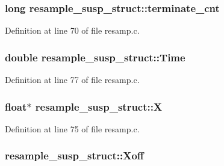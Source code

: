\subsubsection[{\texorpdfstring{terminate\+\_\+cnt}{terminate_cnt}}]{\setlength{\rightskip}{0pt plus 5cm}long resample\+\_\+susp\+\_\+struct\+::terminate\+\_\+cnt}\hypertarget{structresample__susp__struct_a2b492b96f18aa250e3dcd38f0ed374ac}{}\label{structresample__susp__struct_a2b492b96f18aa250e3dcd38f0ed374ac}


Definition at line 70 of file resamp.\+c.

\subsubsection[{\texorpdfstring{Time}{Time}}]{\setlength{\rightskip}{0pt plus 5cm}double resample\+\_\+susp\+\_\+struct\+::\+Time}\hypertarget{structresample__susp__struct_a0d18bcc4f4fa6c528de65a4a0dceaa4f}{}\label{structresample__susp__struct_a0d18bcc4f4fa6c528de65a4a0dceaa4f}


Definition at line 77 of file resamp.\+c.

\subsubsection[{\texorpdfstring{X}{X}}]{\setlength{\rightskip}{0pt plus 5cm}float$\ast$ resample\+\_\+susp\+\_\+struct\+::X}\hypertarget{structresample__susp__struct_a4330450bbb9aadd67d9504d26f7f4ed4}{}\label{structresample__susp__struct_a4330450bbb9aadd67d9504d26f7f4ed4}


Definition at line 75 of file resamp.\+c.

\subsubsection[{\texorpdfstring{Xoff}{Xoff}}]{ resample\+\_\+susp\+\_\+struct\+::\+Xoff}\hypertarget{structresample__susp__struct_aaa19a541e756553ab84d0d581106496b}{}\label{structresample__susp__struct_aaa19a541e756553ab84d0d581106496b}



